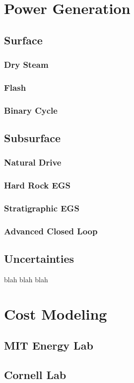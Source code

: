 \section{Power Generation}\label{ch2:elec}
\subsection{Surface}
\subsubsection{Dry Steam}
\subsubsection{Flash}
\subsubsection{Binary Cycle}
\subsection{Subsurface}
\subsubsection{Natural Drive}
\subsubsection{Hard Rock EGS}
\subsubsection{Stratigraphic EGS}
\subsubsection{Advanced Closed Loop}
\subsection{Uncertainties}
blah blah blah

\section{Cost Modeling}\label{ch2:costmod}
\subsection{MIT Energy Lab}
\subsection{Cornell Lab}

